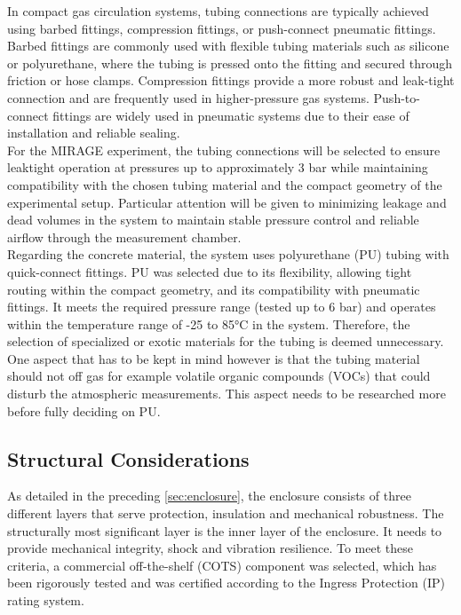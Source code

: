 In compact gas circulation systems, tubing connections are typically achieved using barbed fittings, compression fittings, or push-connect pneumatic fittings. Barbed fittings are commonly used with flexible tubing materials such as silicone or polyurethane, where the tubing is pressed onto the fitting and secured through friction or hose clamps. Compression fittings provide a more robust and leak-tight connection and are frequently used in higher-pressure gas systems. Push-to-connect fittings are widely used in pneumatic systems due to their ease of installation and reliable sealing.\\
For the MIRAGE experiment, the tubing connections will be selected to ensure leaktight operation at pressures up to approximately 3 bar while maintaining compatibility with the chosen tubing material and the compact geometry of the experimental setup. Particular attention will be given to minimizing leakage and dead volumes in the system to maintain stable pressure control and reliable airflow through the measurement chamber.\\
Regarding the concrete material, the system uses polyurethane (PU) tubing with quick-connect fittings. PU was selected due to its flexibility, allowing tight routing within the compact geometry, and its compatibility with pneumatic fittings. It meets the required pressure range (tested up to 6 bar) and operates within the temperature range of -25 to 85°C in the system. Therefore, the selection of specialized or exotic materials for the tubing is deemed unnecessary. One aspect that has to be kept in mind however is that the tubing material should not off gas for example volatile organic compounds (VOCs) that could disturb the atmospheric measurements. This aspect needs to be researched more before fully deciding on PU.

\subsection{Structural Considerations}

As detailed in the preceding \autoref{sec:enclosure}, the enclosure consists of three different layers that serve protection, insulation and mechanical robustness. The structurally most significant layer is the inner layer of the enclosure. It needs to provide mechanical integrity, shock and vibration resilience. To meet these criteria, a commercial off-the-shelf (COTS) component was selected, which has been rigorously tested and was certified according to the Ingress Protection (IP) rating system.\\

